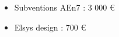 \begin{frame}
   \begin{itemize}
      \item Subventions AEn7 : 3 000 €
      \item Elsys design : 700 €
   \end{itemize}
\end{frame}
